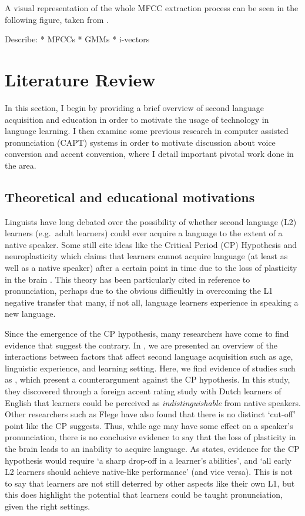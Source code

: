 \documentclass
[
    a4paper,
    twoside,
    12pt
]
{report}
\begin{document}
A visual representation of the whole MFCC extraction process can be seen
in the following figure, taken from \textcite{jurafsky}.

Describe: * MFCCs * GMMs * i-vectors
\chapter{Literature Review}

In this section, I begin by providing a brief overview of second
language acquisition and education in order to motivate the usage of
technology in language learning. I then examine some previous research
in computer assisted pronunciation (CAPT) systems in order to motivate
discussion about voice conversion and accent conversion, where I detail
important pivotal work done in the area.

\section{Theoretical and educational
motivations}\label{theoretical-and-educational-motivations}

\label{sec:theo-edu} Linguists have long debated over the possibility of
whether second language (L2) learners (e.g.~adult learners) could ever
acquire a language to the extent of a native speaker. Some still cite
ideas like the Critical Period (CP) Hypothesis and neuroplasticity which
claims that learners cannot acquire language (at least as well as a
native speaker) after a certain point in time due to the loss of
plasticity in the brain \parencite{lenneberg1967,scovel1988}. This
theory has been particularly cited in reference to pronunciation,
perhaps due to the obvious difficultly in overcoming the L1 negative
transfer that many, if not all, language learners experience in speaking
a new language.

Since the emergence of the CP hypothesis, many researchers have come to
find evidence that suggest the contrary. In \textcite{lengeris2012}, we
are presented an overview of the interactions between factors that
affect second language acquisition such as age, linguistic experience,
and learning setting. Here, we find evidence of studies such as
\textcite{bongaerts1995}, which present a counterargument against the CP
hypothesis. In this study, they discovered through a foreign accent
rating study with Dutch learners of English that learners could be
perceived as \textit{indistinguishable} from native speakers. Other
researchers such as Flege have also found that there is no distinct
`cut-off' point like the CP suggests. Thus, while age may have some
effect on a speaker's pronunciation, there is no conclusive evidence to
say that the loss of plasticity in the brain leads to an inability to
acquire language. As \textcite{lengeris2012} states, evidence for the CP
hypothesis would require `a sharp drop-off in a learner's abilities',
and `all early L2 learners should achieve native-like performance' (and
vice versa). This is not to say that learners are not still deterred by
other aspects like their own L1, but this does highlight the potential
that learners could be taught pronunciation, given the right settings.
\end{document}
